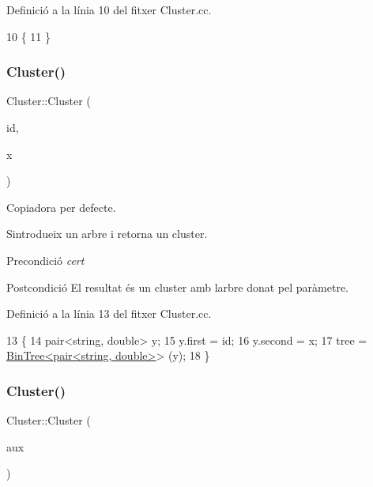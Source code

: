 Definició a la línia 10 del fitxer Cluster.\+cc.


\begin{DoxyCode}
10                  \{
11 \}
\end{DoxyCode}
\mbox{\label{class_cluster_a816d3dca3b1b678a28af2d31e8fc7e65}} 
\subsubsection{\texorpdfstring{Cluster()}{Cluster()}\hspace{0.1cm}{\footnotesize\ttfamily [2/3]}}
{\footnotesize\ttfamily Cluster\+::\+Cluster (\begin{DoxyParamCaption}\item[{string}]{id,  }\item[{double}]{x }\end{DoxyParamCaption})}



Copiadora per defecte. 

S\textquotesingle{}introdueix un arbre i retorna un cluster.

\begin{DoxyPrecond}{Precondició}
{\itshape cert} 
\end{DoxyPrecond}
\begin{DoxyPostcond}{Postcondició}
El resultat és un cluster amb l\textquotesingle{}arbre donat pel paràmetre. 
\end{DoxyPostcond}


Definició a la línia 13 del fitxer Cluster.\+cc.


\begin{DoxyCode}
13                                     \{
14     pair<string, double> y;
15     y.first = id;
16     y.second = x;
17     tree = \hyperlink{class_bin_tree}{BinTree<pair<string, double>}> (y);
18 \}
\end{DoxyCode}
\mbox{\label{class_cluster_a0f3bcdf573567f07c610400996faa89f}} 
\subsubsection{\texorpdfstring{Cluster()}{Cluster()}\hspace{0.1cm}{\footnotesize\ttfamily [3/3]}}
{\footnotesize\ttfamily Cluster\+::\+Cluster (\begin{DoxyParamCaption}\item[{\hyperlink{class_bin_tree}{Bin\+Tree}$<$ string $>$}]{aux }\end{DoxyParamCaption})}



